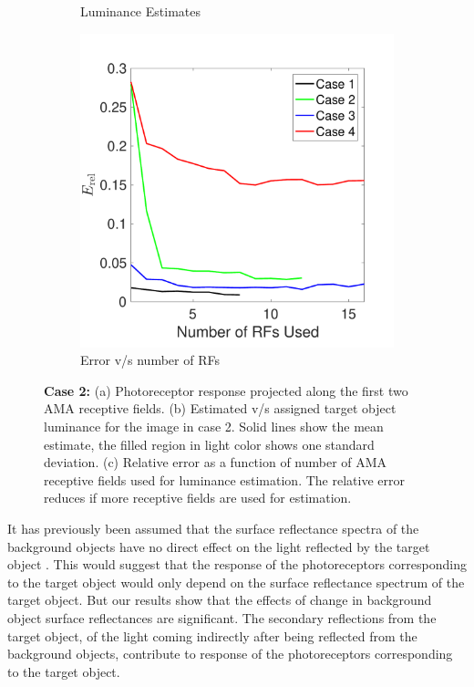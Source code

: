 \documentclass{jov}
\begin{document}
\begin{figure}
\begin{subfigure}[b]{0.3 \textwidth}
        \caption{Luminance Estimates}
        \label{fig:case2Estimates}
    \end{subfigure}
            \begin{subfigure}[b]{0.3 \textwidth}
        \includegraphics[width=\textwidth]{../Figures/Figure10/Figure10_c.pdf}
        \caption{Error v/s number of RFs}
        \label{fig:ErrorVsNFilters}
    \end{subfigure}
    \caption{{\bf Case 2:} (a) Photoreceptor response projected along the first two AMA receptive fields. (b) Estimated v/s assigned target object luminance for the image in case 2. Solid lines show the mean estimate, the filled region in light color  shows one standard deviation. (c) Relative error as a function of number of AMA receptive fields used for luminance estimation. The relative error reduces if more receptive fields are used for estimation.}
\label{fig:case2Results}
\end{figure}

It has previously been assumed that the surface reflectance spectra of the background objects have no direct effect on the light reflected by the target object \cite{BrainardWandellRetinex}. This would suggest that the response of the photoreceptors corresponding to the target object would only depend on the surface reflectance spectrum of the target object. But our results show that the effects of change in background object surface reflectances are significant. The secondary reflections from the target object, of the light coming indirectly after being reflected from the background objects, contribute to response of the photoreceptors corresponding to the target object.
\end{document}

